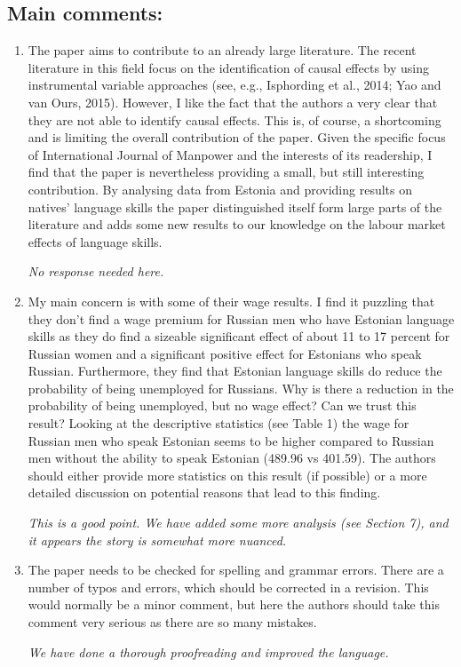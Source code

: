 \documentclass{article}
\newenvironment{response}
{\slshape}{}
\begin{document}
\subsection{Main comments:}


\begin{enumerate}
\item The paper aims to contribute to an already large
  literature. The recent literature in this field focus on the
  identification of causal effects by using instrumental variable
  approaches (see, e.g., Isphording et al., 2014; Yao and van Ours,
  2015). However, I like the fact that the authors a very clear that
  they are not able to identify causal effects. This is, of course, a
  shortcoming and is limiting the overall contribution of the
  paper. Given the specific focus of International Journal of Manpower
  and the interests of its readership, I find that the paper is
  nevertheless providing a small, but still interesting
  contribution. By analysing data from Estonia and providing results
  on natives’ language skills the paper distinguished itself form
  large parts of the literature and adds some new results to our
  knowledge on the labour market effects of language skills.

  \begin{response}
    No response needed here.
  \end{response}

\item 
  My main concern is with some of their wage results. I find it
  puzzling that they don’t find a wage premium for Russian men who
  have Estonian language skills as they do find a sizeable significant
  effect of about 11 to 17 percent for Russian women and a significant
  positive effect for Estonians who speak Russian. Furthermore, they
  find that Estonian language skills do reduce the probability of
  being unemployed for Russians. Why is there a reduction in the
  probability of being unemployed, but no wage effect? Can we trust
  this result? Looking at the descriptive statistics (see Table 1) the
  wage for Russian men who speak Estonian seems to be higher compared
  to Russian men without the ability to speak Estonian (489.96 vs
  401.59). The authors should either provide more statistics on this
  result (if possible) or a more detailed discussion on potential
  reasons that lead to this finding.

  \begin{response}
    This is a good point.  We have added some more analysis (see
    Section 7), and it appears the story is somewhat more nuanced.
  \end{response}
\item The paper needs to be checked for spelling and grammar
  errors. There are a number of typos and errors, which should be
  corrected in a revision. This would normally be a minor comment, but
  here the authors should take this comment very serious as there are
  so many mistakes.

  \begin{response}
    We have done a thorough proofreading and improved the language. 
  \end{response}
\end{enumerate}
\end{document}
